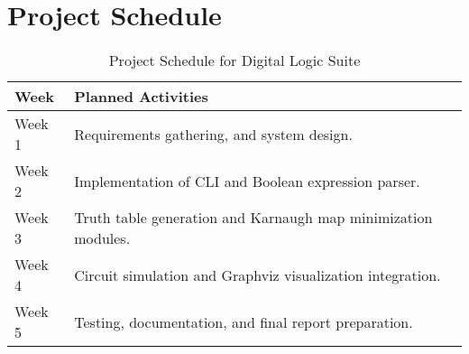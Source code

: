 \section{Project Schedule}
\begin{table}[ht!]
    \centering
    \begin{tabular}{|>{\raggedright}p{2cm}|p{10cm}|}
        \hline
        \textbf{Week} & \textbf{Planned Activities}                                   \\
        \hline
        Week 1        & Requirements gathering, and system design.                    \\
        \hline
        Week 2        & Implementation of CLI and Boolean expression parser.          \\
        \hline
        Week 3        & Truth table generation and Karnaugh map minimization modules. \\
        \hline
        Week 4        & Circuit simulation and Graphviz visualization integration.    \\
        \hline
        Week 5        & Testing, documentation, and final report preparation.         \\
        \hline
    \end{tabular}
    \caption{Project Schedule for Digital Logic Suite}
\end{table}
